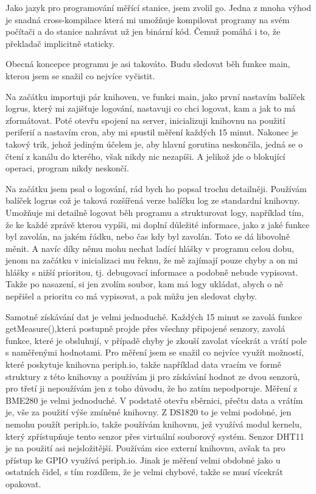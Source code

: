 Jako jazyk pro programování měřící stanice, jsem zvolil \gls{go}. Jedna z mnoha výhod je snadná \gls{cross-kompilace} 
která mi umožňuje kompilovat programy na svém počítači a do stanice nahrávat už jen binární kód. Čemuž pomáhá i to, že 
překladač implicitně  staticky.

Obecná koncepce programu je asi takováto. Budu sledovat běh funkce main, kterou jsem se snažil co nejvíce vyčistit.

Na začátku importuji pár knihoven, ve funkci main, jako první nastavím balíček logrus, který mi zajišťuje logování, 
nastavuji co chci logovat, kam a jak to má zformátovat. Poté otevřu spojení na server, inicializuji knihovnu na použití 
periferií a nastavím cron, aby mi spustil měření každých 15 minut. Nakonec je takový trik, jehož jediným účelem je, aby 
hlavní gorutina neskončila, jedná se o čtení z kanálu do kterého, však nikdy nic nezapíši. A jelikož jde o blokující 
operaci, program nikdy neskončí.

Na začátku jsem psal o logování, rád bych ho popsal trochu detailněji. Používám balíček logrus což je taková rozšířená 
verze balíčku log ze standardní knihovny. Umožňuje mi detailně logovat běh programu a strukturovat logy, například tím, 
že ke každé zprávě kterou vypíši, mi doplní důležité informace, jako z jaké funkce byl zavolán, na jakém řádku, nebo čas 
kdy byl zavolán. Toto se dá libovolně měnit. A navíc díky němu mohu nechat ladící hlášky v programu celou dobu, jenom na 
začátku v inicializaci mu řeknu, že mě zajímají pouze chyby a on mi hlášky s nižší prioritou, tj. debugovací informace 
a podobně nebude vypisovat. Takže po nasazení, si jen zvolím soubor, kam má logy ukládat, abych o ně nepřišel a prioritu 
co má vypisovat, a pak můžu jen sledovat chyby.

Samotné získávání dat je velmi jednoduché. Každých 15 minut se zavolá funkce getMeasure(),která postupně projde přes 
všechny připojené senzory, zavolá funkce, které je obsluhují, v případě chyby je zkouší zavolat vícekrát a vrátí pole 
s naměřenými hodnotami. Pro měření jsem se snažil co nejvíce využít možností, které poskytuje knihovna periph.io, takže 
například data vracím ve formě struktury z této knihovny a používám ji pro získávání hodnot ze dvou senzorů, pro třetí 
ji nepoužívám jen z toho důvodu, že ho zatím nepodporuje. Měření z BME280 je velmi jednoduché. V podstatě otevřu 
sběrnici, přečtu data a vrátím je, vše za použití výše zmíněné knihovny. Z DS1820 to je velmi podobné, jen nemohu použít 
periph.io, takže používám knihovnu, jež využívá modul kernelu, který zpřístupňuje tento senzor přes virtuální souborový 
systém. Senzor DHT11 je na použití asi nejsložitější. Používám sice externí knihovnu, avšak ta pro přístup ke GPIO 
využívá periph.io. Jinak je měření velmi obdobné jako u ostatních čidel, s tím rozdílem, že je velmi chybové, takže se 
musí vícekrát opakovat.


